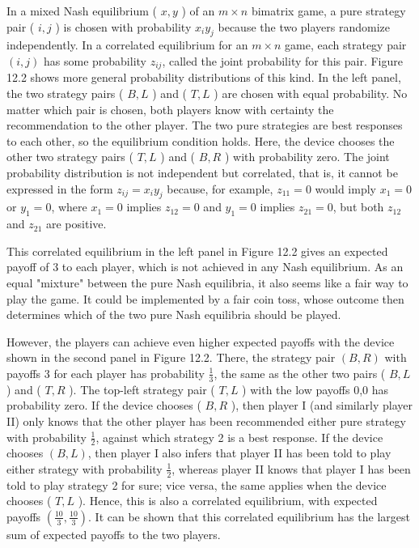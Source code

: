 \documentclass[12pt]{article}
\begin{document}
In a mixed Nash equilibrium ( $x, y$ ) of an $m \times n$ bimatrix game, a pure strategy pair ( $i, j$ ) is chosen with probability $x_{i} y_{j}$ because the two players randomize independently. In a correlated equilibrium for an $m \times n$ game, each strategy pair $(i, j)$ has some probability $z_{i j}$, called the joint probability for this pair. Figure 12.2 shows more general probability distributions of this kind. In the left panel, the two strategy pairs ( $B, L$ ) and ( $T, L$ ) are chosen with equal probability. No matter which pair is chosen, both players know with certainty the recommendation to the other player. The two pure strategies are best responses to each other, so the equilibrium condition holds. Here, the device chooses the other two strategy pairs ( $T, L$ ) and ( $B, R$ ) with probability zero. The joint probability distribution is not independent but correlated, that is, it cannot be expressed in the form $z_{i j}=x_{i} y_{j}$ because, for example, $z_{11}=0$ would imply $x_{1}=0$ or $y_{1}=0$, where $x_{1}=0$ implies $z_{12}=0$ and $y_{1}=0$ implies $z_{21}=0$, but both $z_{12}$ and $z_{21}$ are positive.

This correlated equilibrium in the left panel in Figure 12.2 gives an expected payoff of 3 to each player, which is not achieved in any Nash equilibrium. As an equal "mixture" between the pure Nash equilibria, it also seems like a fair way to play the game. It could be implemented by a fair coin toss, whose outcome then determines which of the two pure Nash equilibria should be played.

However, the players can achieve even higher expected payoffs with the device shown in the second panel in Figure 12.2. There, the strategy pair $(B, R)$ with payoffs 3 for each player has probability $\frac{1}{3}$, the same as the other two pairs ( $B, L$ ) and ( $T, R$ ). The top-left strategy pair ( $T, L$ ) with the low payoffs 0,0 has probability zero. If the device chooses ( $B, R$ ), then player I (and similarly player II) only knows that the other player has been recommended either pure strategy with probability $\frac{1}{2}$, against which strategy 2 is a best response. If the device chooses $(B, L)$, then player I also infers that player II has been told to play either strategy with probability $\frac{1}{2}$, whereas player II knows that player I has been told to play strategy 2 for sure; vice versa, the same applies when the device chooses ( $T, L$ ). Hence, this is also a correlated equilibrium, with expected payoffs $\left(\frac{10}{3}, \frac{10}{3}\right)$. It can be shown that this correlated equilibrium has the largest sum of expected payoffs to the two players.
\end{document}
